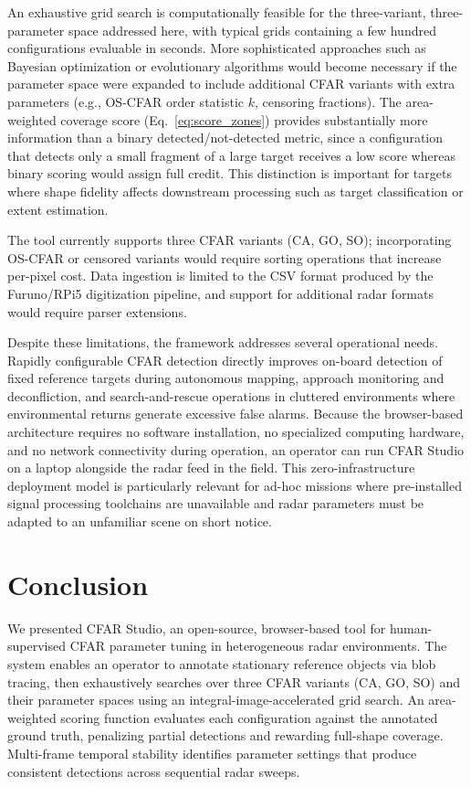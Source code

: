 \documentclass[conf]{new-aiaa}
\begin{document}
An exhaustive grid search is computationally feasible for the three-variant, three-parameter space addressed here, with typical grids containing a few hundred configurations evaluable in seconds. More sophisticated approaches such as Bayesian optimization or evolutionary algorithms would become necessary if the parameter space were expanded to include additional CFAR variants with extra parameters (e.g., OS-CFAR order statistic $k$, censoring fractions). The area-weighted coverage score (Eq.~\ref{eq:score_zones}) provides substantially more information than a binary detected/not-detected metric, since a configuration that detects only a small fragment of a large target receives a low score whereas binary scoring would assign full credit. This distinction is important for targets where shape fidelity affects downstream processing such as target classification or extent estimation.

The tool currently supports three CFAR variants (CA, GO, SO); incorporating OS-CFAR or censored variants would require sorting operations that increase per-pixel cost. Data ingestion is limited to the CSV format produced by the Furuno/RPi5 digitization pipeline, and support for additional radar formats would require parser extensions.

Despite these limitations, the framework addresses several operational needs. Rapidly configurable CFAR detection directly improves on-board detection of fixed reference targets during autonomous mapping, approach monitoring and deconfliction, and search-and-rescue operations in cluttered environments where environmental returns generate excessive false alarms. Because the browser-based architecture requires no software installation, no specialized computing hardware, and no network connectivity during operation, an operator can run CFAR Studio on a laptop alongside the radar feed in the field. This zero-infrastructure deployment model is particularly relevant for ad-hoc missions where pre-installed signal processing toolchains are unavailable and radar parameters must be adapted to an unfamiliar scene on short notice.

\section{Conclusion}
We presented CFAR Studio, an open-source, browser-based tool for human-supervised CFAR parameter tuning in heterogeneous radar environments. The system enables an operator to annotate stationary reference objects via blob tracing, then exhaustively searches over three CFAR variants (CA, GO, SO) and their parameter spaces using an integral-image-accelerated grid search. An area-weighted scoring function evaluates each configuration against the annotated ground truth, penalizing partial detections and rewarding full-shape coverage. Multi-frame temporal stability identifies parameter settings that produce consistent detections across sequential radar sweeps.
\end{document}
